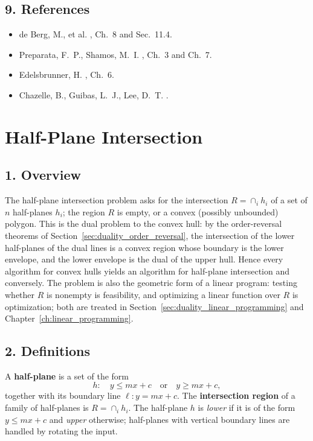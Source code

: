 \subsection{9. References}

\begin{itemize}
\item de Berg, M., et al. \cite{deberg2008}, Ch.~8 and Sec.~11.4.
\item Preparata, F.~P., Shamos, M.~I. \cite{preparata1985}, Ch.~3 and
  Ch.~7.
\item Edelsbrunner, H. \cite{edelsbrunner1987}, Ch.~6.
\item Chazelle, B., Guibas, L.~J., Lee, D.~T. \cite{chazelle1985power}.
\end{itemize}


\section{Half-Plane Intersection}
\label{sec:duality_half_plane_intersection}

\subsection{1. Overview}

The half-plane intersection problem asks for the intersection
$R = \cap_i h_i$ of a set of $n$ half-planes $h_i$; the region $R$ is empty,
or a convex (possibly unbounded) polygon. This is the dual problem to the
convex hull: by the order-reversal theorems of
Section~\ref{sec:duality_order_reversal}, the intersection of the lower
half-planes of the dual lines is a convex region whose boundary is the lower
envelope, and the lower envelope is the dual of the upper hull. Hence every
algorithm for convex hulls yields an algorithm for half-plane intersection
and conversely. The problem is also the geometric form of a linear program:
testing whether $R$ is nonempty is feasibility, and optimizing a linear
function over $R$ is optimization; both are treated in
Section~\ref{sec:duality_linear_programming} and
Chapter~\ref{ch:linear_programming}.

\subsection{2. Definitions}

\begin{definition}\label{def:geo_duality_halfplane}
  A \textbf{half-plane} is a set of the form
  \[
    h : \quad y \le mx + c \quad \text{or} \quad y \ge mx + c ,
  \]
  together with its boundary line $\ell : y = mx + c$. The
  \textbf{intersection region} of a family of half-planes is
  $R = \cap_i h_i$. The half-plane $h$ is \emph{lower} if it is of the form
  $y \le mx + c$ and \emph{upper} otherwise; half-planes with vertical
  boundary lines are handled by rotating the input.
\end{definition}

